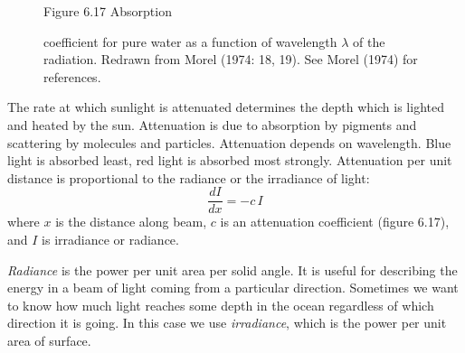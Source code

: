 \begin{figure}[t!]
\centering
{}
\footnotesize
Figure 6.17 Absorption \rule{0mm}{3ex}coefficient for pure water as a
function of wavelength $\lambda$ of the radiation. Redrawn from Morel
(1974: 18, 19). See Morel (1974) for references.

\label{fig:attenuation}
\vspace{-4ex}
\end{figure}

The rate at which sunlight is attenuated determines the depth which is
lighted and heated by the sun. Attenuation is due to absorption by
pigments and scattering by molecules and particles. Attenuation
depends on wavelength.  Blue light is absorbed least, red light is
absorbed most strongly.  Attenuation per unit distance is proportional
to the radiance or the irradiance of light:
\begin{equation}
\frac{dI}{dx} = -c \, I
\end{equation}
where $x$ is the distance along beam, $c$ is an attenuation
coefficient (figure 6.17), and $I$ is irradiance or radiance.

\textit{Radiance} is the power per unit area
per solid angle. It is useful for describing the energy in a beam of
light coming from a particular direction.  Sometimes we want to know
how much light reaches some depth in the ocean regardless of which
direction it is going. In this case we use
\textit{irradiance}, which is the power per
unit area of surface.

